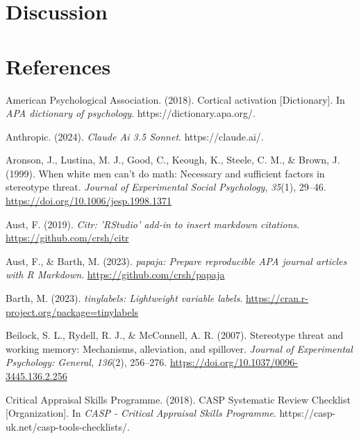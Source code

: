 \documentclass[
  stu]{apa7}
\newlength{\cslhangindent}
\newenvironment{CSLReferences}[2] %
 {\begin{list}{}{%
  \setlength{\itemindent}{0pt}
  \setlength{\leftmargin}{0pt}
  \setlength{\parsep}{0pt}
  \ifodd #1
   \setlength{\leftmargin}{\cslhangindent}
   \setlength{\itemindent}{-1\cslhangindent}
  \fi
  \setlength{\itemsep}{#2\baselineskip}}}
 {\end{list}}
\begin{document}
\section{Discussion}\label{discussion}

\newpage

\section{References}\label{references}

\label{refs}
\begin{CSLReferences}{1}{0}
American Psychological Association. (2018). Cortical activation {[}Dictionary{]}. In \emph{APA dictionary of psychology}. https://dictionary.apa.org/.

Anthropic. (2024). \emph{Claude {Ai} 3.5 {Sonnet}}. https://claude.ai/.

Aronson, J., Lustina, M. J., Good, C., Keough, K., Steele, C. M., \& Brown, J. (1999). When white men can't do math: {Necessary} and sufficient factors in stereotype threat. \emph{Journal of Experimental Social Psychology}, \emph{35}(1), 29--46. \url{https://doi.org/10.1006/jesp.1998.1371}

Aust, F. (2019). \emph{Citr: 'RStudio' add-in to insert markdown citations}. \url{https://github.com/crsh/citr}

Aust, F., \& Barth, M. (2023). \emph{{papaja}: {Prepare} reproducible {APA} journal articles with {R Markdown}}. \url{https://github.com/crsh/papaja}

Barth, M. (2023). \emph{{tinylabels}: Lightweight variable labels}. \url{https://cran.r-project.org/package=tinylabels}

Beilock, S. L., Rydell, R. J., \& McConnell, A. R. (2007). Stereotype threat and working memory: {Mechanisms}, alleviation, and spillover. \emph{Journal of Experimental Psychology: General}, \emph{136}(2), 256--276. \url{https://doi.org/10.1037/0096-3445.136.2.256}

Critical Appraisal Skills Programme. (2018). {CASP Systematic Review Checklist} {[}Organization{]}. In \emph{CASP - Critical Appraisal Skills Programme}. https://casp-uk.net/casp-tools-checklists/.


\end{CSLReferences}
\end{document}
